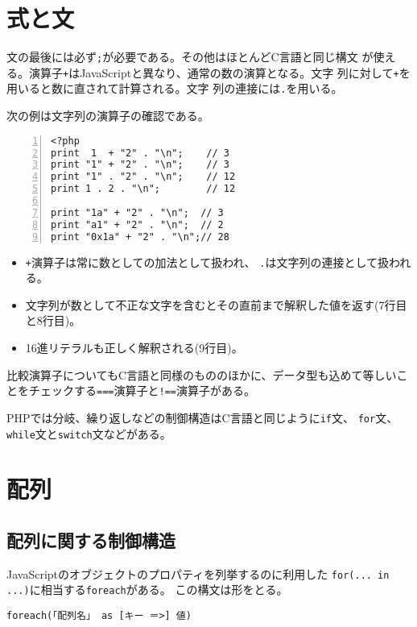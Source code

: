 \section{式と文}
文の最後には必ず\texttt{;}が必要である。その他はほとんどC言語と同じ構文
が使える。演算子\texttt{+}はJavaScriptと異なり、通常の数の演算となる。文字
列に対して\texttt{+}を用いると数に直されて計算される。文字
列の連接には\texttt{.}を用いる。
\begin{Exec}\upshape
次の例は文字列の演算子の確認である。
\begin{Verbatim}[numbers=left]
<?php
print  1  + "2" . "\n";    // 3
print "1" + "2" . "\n";    // 3
print "1" . "2" . "\n";    // 12
print 1 . 2 . "\n";        // 12

print "1a" + "2" . "\n";  // 3
print "a1" + "2" . "\n";  // 2
print "0x1a" + "2" . "\n";// 28
\end{Verbatim}
\begin{itemize}
 \item \texttt{+}演算子は常に数としての加法として扱われ、
 \texttt{.}は文字列の連接として扱われる。
 \item 文字列が数として不正な文字を含むとその直前まで解釈した値を返す(7行目と8行目)。
 \item 16進リテラルも正しく解釈される(9行目)。
\end{itemize}
\end{Exec}
比較演算子についてもC言語と同様のもののほかに、データ型も込めて等しいこ
とをチェックする\texttt{===}演算子と\texttt{!==}演算子がある。



PHPでは分岐、繰り返しなどの制御構造はC言語と同じように\texttt{if}文、
\texttt{for}文、\texttt{while}文と\texttt{switch}文などがある。

\section{配列}
\subsection{配列に関する制御構造}
JavaScriptのオブジェクトのプロパティを列挙するのに利用した
\texttt{for(... in ...)}に相当する\texttt{foreach}がある。
この構文は形をとる。

\texttt{foreach(「配列名」 as [キー ＝>] 値)}

